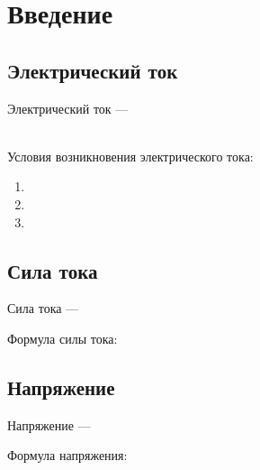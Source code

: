 
\section{Введение}



\setlength\parindent{24pt}
\subsection{Электрический ток}
Электрический ток --- \hrulefill

\hrulefill
\\
Условия возникновения электрического тока:
\begin{enumerate}
    \item\hrulefill%
    \item\hrulefill%
    \item\hrulefill %
\end{enumerate}

\subsection{Сила тока}
Сила тока --- %
\hrulefill 

\hrulefill

\hrulefill 

Формула силы тока: 



\subsection{Напряжение}
Напряжение --- %
\hrulefill 

\hrulefill 

\hrulefill 

Формула напряжения: 

